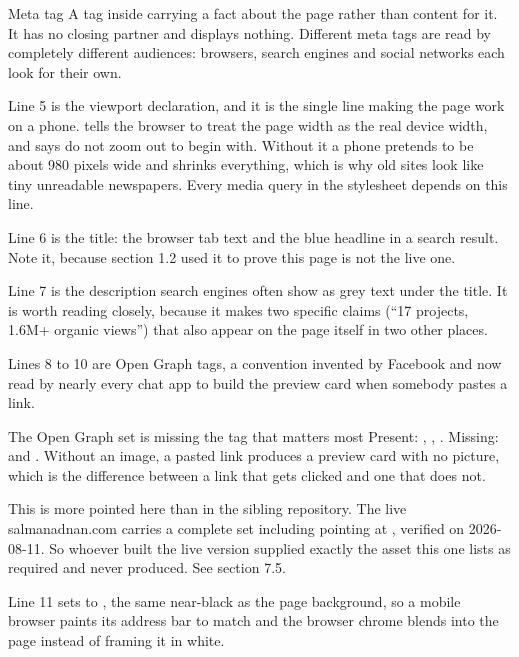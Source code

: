 \begin{jargon}{Meta tag}
A tag inside  carrying a fact about the page rather than content for
it. It has no closing partner and displays nothing. Different meta tags are read by
completely different audiences: browsers, search engines and social networks each
look for their own.
\end{jargon}

Line 5 is the viewport declaration, and it is the single line making the page work
on a phone.  tells the browser to treat the page width as
the real device width, and  says do not zoom out to begin
with. Without it a phone pretends to be about 980 pixels wide and shrinks
everything, which is why old sites look like tiny unreadable newspapers. Every
media query in the stylesheet depends on this line.

Line 6 is the title: the browser tab text and the blue headline in a search result.
Note it, because section 1.2 used it to prove this page is not the live one.

Line 7 is the description search engines often show as grey text under the title.
It is worth reading closely, because it makes two specific claims (``17 projects,
1.6M+ organic views'') that also appear on the page itself in two other places.

Lines 8 to 10 are Open Graph tags, a convention invented by Facebook and now read
by nearly every chat app to build the preview card when somebody pastes a link.

\begin{honest}{The Open Graph set is missing the tag that matters most}
Present: , , . Missing:
 and . Without an image, a pasted link produces a
preview card with no picture, which is the difference between a link that gets
clicked and one that does not.

This is more pointed here than in the sibling repository. The live salmanadnan.com
carries a complete set including  pointing at
, verified on 2026-08-11. So whoever built the live version
supplied exactly the asset this one lists as required and never produced. See
section 7.5.
\end{honest}

Line 11 sets  to , the same near-black as the page
background, so a mobile browser paints its address bar to match and the browser
chrome blends into the page instead of framing it in white.

